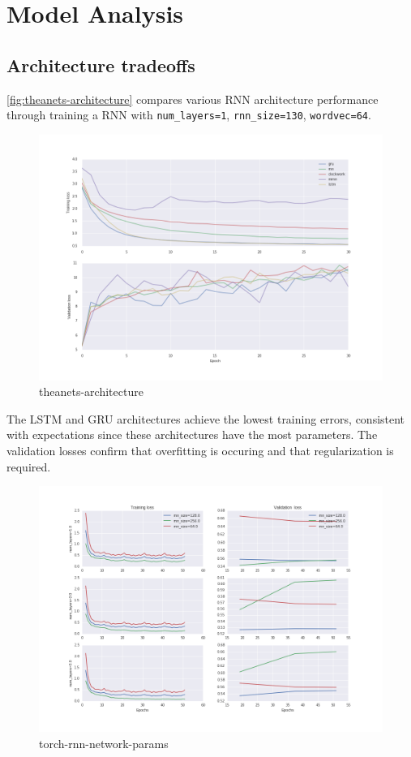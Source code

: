 \documentclass[dissertation.tex]{subfiles}
\begin{document}
\chapter{Model Analysis}

\section{Architecture tradeoffs}

\autoref{fig:theanets-architecture} compares various RNN architecture performance
through training a RNN with \texttt{num\_layers=1}, \texttt{rnn\_size=130},
\texttt{wordvec=64}.

\begin{figure}[htpb]
    \centering
    \includegraphics[width=\linewidth]{Figures/theanets-architecture.png}
    \caption{theanets-architecture}
    \label{fig:theanets-architecture}
\end{figure}

The LSTM and GRU architectures achieve the lowest training errors, consistent with expectations
since these architectures have the most parameters.
The validation losses confirm that overfitting is occuring and that regularization is required.

\begin{figure}[htpb]
    \centering
    \includegraphics[width=\linewidth]{Figures/torch-rnn-network-params.png}
    \caption{torch-rnn-network-params}
    \label{fig:torch-rnn-network-params}
\end{figure}
\end{document}
